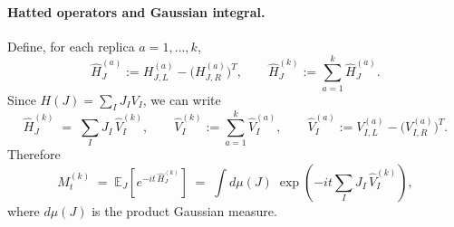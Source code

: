 \documentclass{article}
\theoremstyle{definition}
\newcommand{\nn}{\nonumber}
\newcommand{\lb}{\left(}
\newcommand{\rb}{\right)}
\begin{document}
    \paragraph{Hatted operators and Gaussian integral.}
    Define, for each replica $a=1,\dots,k$,
    \begin{equation}
        \widehat H_{J}^{(a)}:= H_{J,L}^{(a)}- \big(H_{J,R}^{(a)}\big)^{T}, \qquad
        \widehat H_{J}^{(k)}:= \sum_{a=1}^{k}\widehat H_{J}^{(a)}.
    \end{equation}
    Since $H(J)=\sum_{I}J_{I}V_{I}$, we can write
    \begin{equation}
        \widehat H_{J}^{(k)}\;=\; \sum_{I}J_{I}\,\widehat V_{I}^{(k)}, \qquad \widehat
        V_{I}^{(k)}:= \sum_{a=1}^{k}\widehat V_{I}^{(a)}, \qquad \widehat V_{I}^{(a)}
        := V_{I,L}^{(a)}- \big(V_{I,R}^{(a)}\big)^{T}.
    \end{equation}
    Therefore
    \begin{equation}
        M_{t}^{(k)}\;=\; \mathbb{E}_{J}\!\left[e^{-it\,\widehat H_J^{(k)}}\right]
        \;=\;\int d\mu(J)\;\exp\!\left(-it\sum_{I}J_{I}\,\widehat V_{I}^{(k)}\right
        ), \label{eq:Mt_as_gaussian_integral}
    \end{equation}
    where $d\mu(J)$ is the product Gaussian measure.


\end{document}
